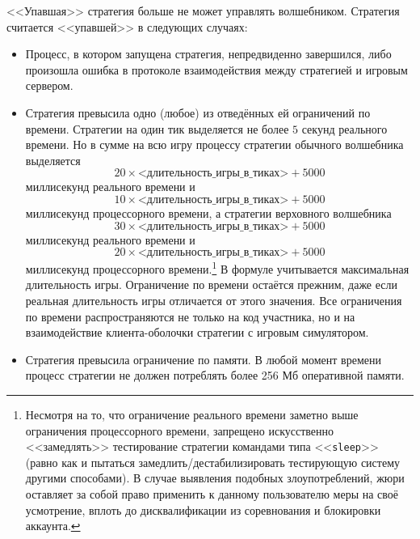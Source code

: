 <<Упавшая>> стратегия больше не может управлять волшебником. Стратегия считается <<упавшей>> в следующих случаях:
\begin{itemize}
  \item Процесс, в котором запущена стратегия, непредвиденно завершился, либо произошла ошибка в протоколе взаимодействия между стратегией
        и игровым сервером.
  \item Стратегия превысила одно (любое) из отведённых ей ограничений по времени. Стратегии на один тик выделяется не более $5$ секунд
        реального времени. Но в сумме на всю игру процессу стратегии обычного волшебника выделяется
        \begin{equation}
        20\times\textit{<длительность\_игры\_в\_тиках>}+5000
        \end{equation}
        миллисекунд реального времени и
        \begin{equation}
        10\times\textit{<длительность\_игры\_в\_тиках>}+5000
        \end{equation}
        миллисекунд процессорного времени, а стратегии верховного волшебника
        \begin{equation}
        30\times\textit{<длительность\_игры\_в\_тиках>}+5000
        \end{equation}
        миллисекунд реального времени и
        \begin{equation}
        20\times\textit{<длительность\_игры\_в\_тиках>}+5000
        \end{equation}
        миллисекунд процессорного времени.\footnote[3]{Несмотря на то, что ограничение реального времени заметно выше ограничения
        процессорного времени, запрещено искусственно <<замедлять>> тестирование стратегии командами типа <<\texttt{sleep}>> (равно как и
        пытаться замедлить/дестабилизировать тестирующую систему другими способами). В случае выявления подобных злоупотреблений, жюри
        оставляет за собой право применить к данному пользователю меры на своё усмотрение, вплоть до дисквалификации из соревнования и
        блокировки аккаунта.} В формуле учитывается максимальная длительность игры. Ограничение по времени остаётся прежним, даже если
        реальная длительность игры отличается от этого значения. Все ограничения по времени распространяются не только на код участника, но
        и на взаимодействие клиента-оболочки стратегии с игровым симулятором.
  \item Стратегия превысила ограничение по памяти. В любой момент времени процесс стратегии не должен потреблять более 256 Мб оперативной
        памяти.
\end{itemize}

